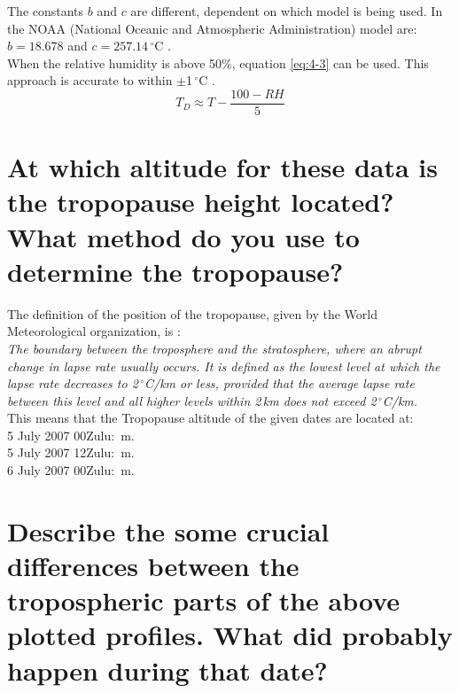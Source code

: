 \documentclass{article}
\begin{document}
The constants $b$ and $c$ are different, dependent on which model is being used. In the NOAA (National Oceanic and Atmospheric Administration) model are: $b = 18.678$ and $c = 257.14$\,$^\circ$C \cite{wikiQ4}.\\

When the relative humidity is above 50\%, equation \ref{eq:4-3} can be used. This approach is accurate to within $\pm$1\,$^\circ$C \cite{wikiQ4}.
\begin{equation}
T_D \approx T - \frac{100 - RH}{5} \label{eq:4-3}
\end{equation}



\newpage
\section{At which altitude for these data is the tropopause height located? What method do you use to determine the tropopause?}
The definition of the position of the tropopause, given by the World Meteorological organization, is \cite{wikiQ5}:\\
\textit{The boundary between the troposphere and the stratosphere, where an abrupt change in lapse rate usually occurs. It is defined as the lowest level at which the lapse rate decreases to 2\,$^\circ$C/km or less, provided that the average lapse rate between this level and all higher levels within 2\,km does not exceed 2\,$^\circ$C/km.}\\

This means that the Tropopause altitude of the given dates are located at:\\
5 July 2007 00Zulu: \,m.\\
5 July 2007 12Zulu: \,m.\\
6 July 2007 00Zulu: \,m.\\



\newpage
\section{Describe the some crucial differences between the tropospheric parts of the above plotted profiles. What did probably happen during that date?}
\end{document}
